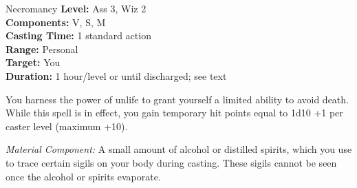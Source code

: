 {Necromancy}
{
	\textbf{Level:}
	Ass 3, Wiz 2\\
	\textbf{Components:}
	V, S, M\\
	\textbf{Casting Time:}
	1 standard action\\
	\textbf{Range:}
	Personal\\
	\textbf{Target:}
	You\\
	\textbf{Duration:}
	1 hour/level or until discharged; see text\\
}
{
	You harness the power of unlife to grant yourself a limited ability to avoid death. While this spell is in effect, you gain temporary hit points equal to 1d10 +1 per caster level (maximum +10).

	\textit{Material Component:}
	A small amount of alcohol or distilled spirits, which you use to trace certain sigils on your body during casting. These sigils cannot be seen once the alcohol or spirits evaporate.

}

